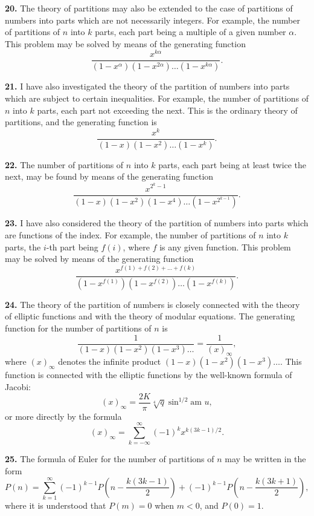 \documentclass[12pt,a4paper]{article}
\begin{document}
\textbf{20.} The theory of partitions may also be extended to the case of partitions of numbers into parts which are not necessarily integers. For example, the number of partitions of $n$ into $k$ parts, each part being a multiple of a given number $\alpha$. This problem may be solved by means of the generating function
\[
\frac{x^{k\alpha}}{(1-x^{\alpha})(1-x^{2\alpha})\ldots(1-x^{k\alpha})}.
\]

\newpage
\setcounter{page}{242}

\textbf{21.} I have also investigated the theory of the partition of numbers into parts which are subject to certain inequalities. For example, the number of partitions of $n$ into $k$ parts, each part not exceeding the next. This is the ordinary theory of partitions, and the generating function is
\[
\frac{x^k}{(1-x)(1-x^2)\ldots(1-x^k)}.
\]

\textbf{22.} The number of partitions of $n$ into $k$ parts, each part being at least twice the next, may be found by means of the generating function
\[
\frac{x^{2^k-1}}{(1-x)(1-x^2)(1-x^4)\ldots(1-x^{2^{k-1}})}.
\]

\textbf{23.} I have also considered the theory of the partition of numbers into parts which are functions of the index. For example, the number of partitions of $n$ into $k$ parts, the $i$-th part being $f(i)$, where $f$ is any given function. This problem may be solved by means of the generating function
\[
\frac{x^{f(1)+f(2)+\ldots+f(k)}}{(1-x^{f(1)})(1-x^{f(2)})\ldots(1-x^{f(k)})}.
\]

\newpage
\setcounter{page}{243}

\textbf{24.} The theory of the partition of numbers is closely connected with the theory of elliptic functions and with the theory of modular equations. The generating function for the number of partitions of $n$ is
\[
\frac{1}{(1-x)(1-x^2)(1-x^3)\ldots} = \frac{1}{(x)_{\infty}},
\]
where $(x)_{\infty}$ denotes the infinite product $(1-x)(1-x^2)(1-x^3)\ldots$. This function is connected with the elliptic functions by the well-known formula of Jacobi:
\[
(x)_{\infty} = \frac{2K}{\pi} \sqrt[4]{q} \sin^{1/2} \text{am } u,
\]
or more directly by the formula
\[
(x)_{\infty} = \sum_{k=-\infty}^{\infty} (-1)^k x^{k(3k-1)/2}.
\]

\textbf{25.} The formula of Euler for the number of partitions of $n$ may be written in the form
\[
P(n) = \sum_{k=1}^{\infty} (-1)^{k-1} P\left(n - \frac{k(3k-1)}{2}\right) + (-1)^{k-1} P\left(n - \frac{k(3k+1)}{2}\right),
\]
where it is understood that $P(m) = 0$ when $m < 0$, and $P(0) = 1$.
\end{document}
